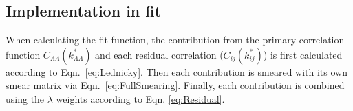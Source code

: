 \subsection{Implementation in fit}

When calculating the fit function, the contribution from the primary correlation function $C_{\Lambda\Lambda}(k^*_{\Lambda\Lambda})$ and each residual correlation  ($C_{ij}(k^*_{ij})$) is first calculated according to Eqn.\ \ref{eq:Lednicky}.
Then each contribution is smeared with its own smear matrix via Eqn.\ \ref{eq:FullSmearing}.
Finally, each contribution is combined using the $\lambda$ weights according to Eqn. \ref{eq:Residual}.

 